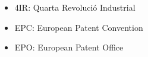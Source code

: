 \documentclass[12pt]{article}
\begin{document}
\vspace{\baselineskip}

\vspace{\baselineskip}
\begin{itemize}
	\item 4IR: Quarta Revolució Industrial\par


\vspace{\baselineskip}
	\item EPC: European Patent Convention\par


\vspace{\baselineskip}
	\item EPO: European Patent Office
\end{itemize}\par
\end{document}
